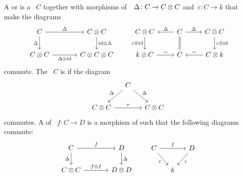 \documentclass[a4paper,10pt,headings=standardclasses]{scrartcl}
\begin{document}
\begin{definition}
  A  or  is a {\dgv}~$C$ together with morphisms of~{\dgv}~$\Delta \colon C \to C \otimes C$ and~$\varepsilon \colon C \to k$ that make the diagrams
  \[
    \begin{tikzcd}[column sep = large]
      C
      \arrow{r}[above]{\Delta}
      \arrow{d}[left]{\Delta}
      &
      C \tensor C
      \arrow{d}[right]{{\id} \tensor \Delta}
      \\
      C \tensor C
      \arrow{r}[below]{\Delta \tensor {\id}}
      &
      C \tensor C \tensor C
    \end{tikzcd}
    \qquad
    \begin{tikzcd}
      C \tensor C
      \arrow{d}[left]{\varepsilon \tensor {\id}}
      &
      C
      \arrow{l}[above]{\Delta}
      \arrow[equal]{d}
      \arrow{r}[above]{\Delta}
      &
      C \tensor C
      \arrow{d}[right]{\varepsilon \tensor {\id}}
      \\
      k \tensor C
      \arrow{r}[above]{\sim}
      &
      C
      &
      C \tensor k
      \arrow{l}[above]{\sim}
    \end{tikzcd}
  \]
  commute.
  The {\dgc}~$C$ is  if the diagram
  \[
    \begin{tikzcd}[column sep = small]
      {}
      &
      C
      \arrow{dl}[above left]{\Delta}
      \arrow{dr}[above right]{\Delta}
      &
      {}
      \\
      C \tensor C
      \arrow{rr}[above]{\tau}
      &
      {}
      &
      C \tensor C
    \end{tikzcd}
  \]
  commutes.
  A  of {\dgc}~$f \colon C \to D$ is a morphism of {\dgvs} such that the following diagrams commute:
  \[
    \begin{tikzcd}[column sep = large]
      C
      \arrow{r}[above]{f}
      \arrow{d}[left]{\Delta}
      &
      D
      \arrow{d}[right]{\Delta}
      \\
      C \tensor C
      \arrow{r}[above]{f \tensor f}
      &
      D \tensor D
    \end{tikzcd}
    \qquad
    \begin{tikzcd}[column sep = small]
      C
      \arrow{rr}[above]{f}
      \arrow{dr}[below left]{\varepsilon}
      &
      {}
      &
      D
      \arrow{dl}[below right]{\varepsilon}
      \\
      {}
      &
      k
      &
      {}
    \end{tikzcd}
  \]
\end{definition}
\end{document}
